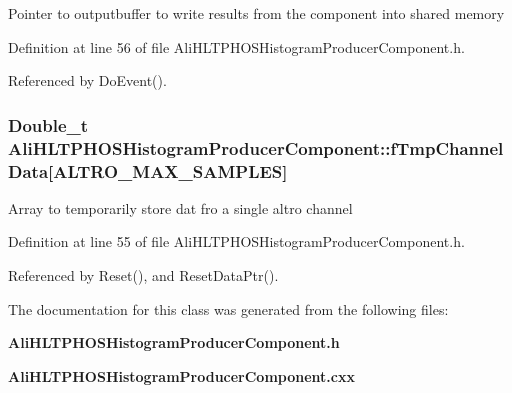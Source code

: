Pointer to outputbuffer to write results from the component into shared memory 

Definition at line 56 of file Ali\-HLTPHOSHistogram\-Producer\-Component.h.

Referenced by Do\-Event().
\subsubsection{\setlength{\rightskip}{0pt plus 5cm}Double\_\-t {\bf Ali\-HLTPHOSHistogram\-Producer\-Component::f\-Tmp\-Channel\-Data}[ALTRO\_\-MAX\_\-SAMPLES]\hspace{0.3cm}{\tt  [private]}}\label{classAliHLTPHOSHistogramProducerComponent_r5}


Array to temporarily store dat fro a single altro channel 

Definition at line 55 of file Ali\-HLTPHOSHistogram\-Producer\-Component.h.

Referenced by Reset(), and Reset\-Data\-Ptr().

The documentation for this class was generated from the following files:\begin{CompactItemize}
\item 
{\bf Ali\-HLTPHOSHistogram\-Producer\-Component.h}\item 
{\bf Ali\-HLTPHOSHistogram\-Producer\-Component.cxx}\end{CompactItemize}
